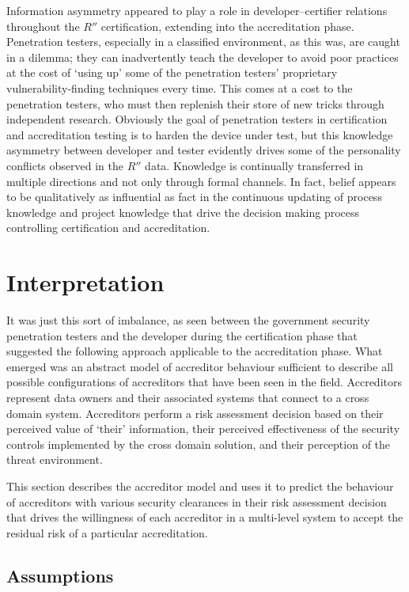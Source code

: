 \documentclass[10pt,letterpaper,conference]{IEEEtran}
\begin{document}
Information asymmetry appeared to play a role in developer--certifier relations throughout the
$R''$ certification, extending into the accreditation phase.  Penetration testers, especially in a
classified environment, as this was, are caught in a dilemma; they can inadvertently teach the
developer to avoid poor practices at the cost of `using up' some of the penetration testers'
proprietary vulnerability-finding techniques every time.  This comes at a cost to the penetration
testers, who must then replenish their store of new tricks through independent research.  Obviously
the goal of penetration testers in certification and accreditation testing is to harden the device
under test, but this knowledge asymmetry between developer and tester evidently drives some of the
personality conflicts observed in the $R''$ data.  Knowledge is continually transferred in multiple
directions and not only through formal channels.  In fact, belief appears to be qualitatively as
influential as fact in the continuous updating of process knowledge and project knowledge that
drive the decision making process controlling certification and accreditation.

\section{Interpretation}

It was just this sort of imbalance, as seen between the government security penetration testers
and the developer during the certification phase that suggested the following approach
applicable to the accreditation phase.  What emerged was an abstract model of accreditor behaviour
sufficient to describe all possible configurations of accreditors that have been seen in the field.
Accreditors represent data owners and their associated systems that connect to a cross domain
system.  Accreditors perform a risk assessment decision based on their perceived value of `their'
information, their perceived effectiveness of the security controls implemented by the cross domain
solution, and their perception of the threat environment.

This section describes the accreditor model and uses it to predict the behaviour of accreditors
with various security clearances in their risk assessment decision that drives the willingness of
each accreditor in a multi-level system to accept the residual risk of a particular accreditation.

\subsection{Assumptions}
\end{document}

